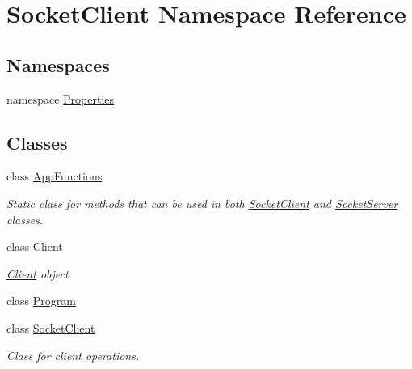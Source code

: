 \hypertarget{namespace_socket_client}{}\section{Socket\+Client Namespace Reference}
\label{namespace_socket_client}
\subsection*{Namespaces}
\begin{DoxyCompactItemize}
\item 
namespace \hyperlink{namespace_socket_client_1_1_properties}{Properties}
\end{DoxyCompactItemize}
\subsection*{Classes}
\begin{DoxyCompactItemize}
\item 
class \hyperlink{class_socket_client_1_1_app_functions}{App\+Functions}
\begin{DoxyCompactList}\small\item\em Static class for methods that can be used in both \hyperlink{class_socket_client_1_1_socket_client}{Socket\+Client} and \hyperlink{namespace_socket_server}{Socket\+Server} classes. \end{DoxyCompactList}\item 
class \hyperlink{class_socket_client_1_1_client}{Client}
\begin{DoxyCompactList}\small\item\em \hyperlink{class_socket_client_1_1_client}{Client} object \end{DoxyCompactList}\item 
class \hyperlink{class_socket_client_1_1_program}{Program}
\item 
class \hyperlink{class_socket_client_1_1_socket_client}{Socket\+Client}
\begin{DoxyCompactList}\small\item\em Class for client operations. \end{DoxyCompactList}\end{DoxyCompactItemize}
